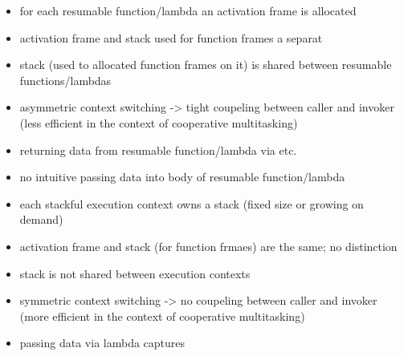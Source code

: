 \begin{itemize}
    \item   for each resumable function/lambda an activation frame is allocated
    \item   activation frame and stack used for function frames a separat
    \item   stack (used to allocated function frames on it) is shared between
            resumable functions/lambdas
    \item   asymmetric context switching -> tight coupeling between caller and
            invoker (less efficient in the context of cooperative multitasking)
    \item   returning data from resumable function/lambda via \yield etc.
    \item   no intuitive passing data into body of resumable function/lambda
\end{itemize}

\begin{itemize}
    \item   each stackful execution context owns a stack (fixed size or growing
            on demand)
    \item   activation frame and stack (for function frmaes) are the same; no
            distinction
    \item   stack is not shared between execution contexts
    \item   symmetric context switching -> no coupeling between caller and
            invoker (more efficient in the context of cooperative multitasking)
    \item   passing data via lambda captures
\end{itemize}
